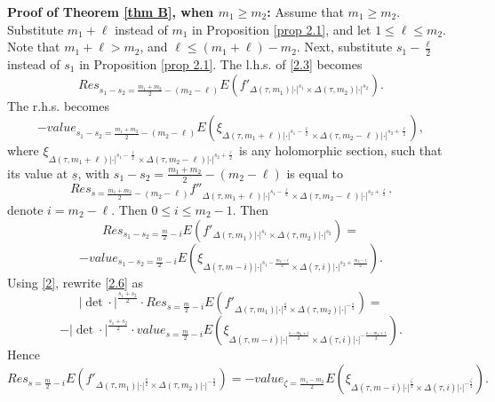 \documentclass[12pts]{amsart}
\begin{document}
 		{\bf Proof of Theorem \ref{thm B}, when $m_1\geq m_2$:} 
 		Assume that $m_1\geq m_2$. Substitute $m_1+\ell$ instead of $m_1$ in Proposition \ref{prop 2.1}, and let $1\leq \ell\leq m_2$. Note that $m_1+\ell>m_2$, and $\ell\leq (m_1+\ell)-m_2$. Next, substitute $s_1-\frac{\ell}{2}$ instead of $s_1$ in Proposition \ref{prop 2.1}. The l.h.s. of \eqref{2.3} becomes
 		\begin{equation}\label{2.4}
 		Res_{s_1-s_2=\frac{m_1+m_2}{2}-(m_2-\ell)}E(f'_{\Delta(\tau,m_1)|\cdot|^{s_1}\times \Delta(\tau,m_2)|\cdot|^{s_2}}).
 		\end{equation}
 		The r.h.s. becomes
 		\begin{equation}\label{2.5}
 		-value_{s_1-s_2=\frac{m_1+m_2}{2}-(m_2-\ell)}E(\xi_{\Delta(\tau,m_1+\ell)|\cdot|^{s_1-\frac{\ell}{2}}\times \Delta(\tau, m_2-\ell)|\cdot|^{s_2+\frac{\ell}{2}}}),
 		\end{equation}
 		where $\xi_{\Delta(\tau,m_1+\ell)|\cdot|^{s_1-\frac{\ell}{2}}\times \Delta(\tau, m_2-\ell)|\cdot|^{s_2+\frac{\ell}{2}}}$ is any holomorphic section, such that its value at $\underline{s}$, with $s_1-s_2=\frac{m_1+m_2}{2}-(m_2-\ell)$ is equal to 
 		$$
 		Res_{s=\frac{m_1+m_2}{2}-(m_2-\ell)}f''_{\Delta(\tau,m_1+\ell)|\cdot|^{s_1-\frac{\ell}{2}}\times \Delta(\tau,m_2-\ell)|\cdot|^{s_2+\frac{\ell}{2}}}.
 		$$
 		denote $i=m_2-\ell$. Then $0\leq i\leq m_2-1$. Then
 		\begin{equation}\label{2.6}
 		Res_{s_1-s_2=\frac{m}{2}-i}E(f'_{\Delta(\tau,m_1)|\cdot|^{s_1}\times \Delta(\tau,m_2)|\cdot|^{s_2}})=
 		\end{equation}
 		$$
 			-value_{s_1-s_2=\frac{m}{2}-i}E(\xi_{\Delta(\tau,m-i)|\cdot|^{s_1-\frac{m_2-i}{2}}\times \Delta(\tau, i)|\cdot|^{s_2+\frac{m_2-i}{2}}}).
 		$$
 		Using \eqref{2}, rewrite \eqref{2.6} as
 		\begin{equation}\label{2.7}
 		|\det\cdot|^{\frac{s_1+s_2}{2}}\cdot Res_{s=\frac{m}{2}-i}E(f'_{\Delta(\tau,m_1)|\cdot|^{\frac{s}{2}}\times \Delta(\tau,m_2)|\cdot|^{-\frac{s}{2}}})=
 		\end{equation}
 		$$
 		-|\det\cdot|^{\frac{s_1+s_2}{2}}\cdot value_{s=\frac{m}{2}-i}E(\xi_{\Delta(\tau,m-i)|\cdot|^{\frac{s-m_2+i}{2}}\times \Delta(\tau, i)|\cdot|^{-\frac{s-m_2+i}{2}}}).
 		$$
 		Hence
 		\begin{equation}\label{2.8}
 		 Res_{s=\frac{m}{2}-i}E(f'_{\Delta(\tau,m_1)|\cdot|^{\frac{s}{2}}\times \Delta(\tau,m_2)|\cdot|^{-\frac{s}{2}}})=
 			-value_{\zeta=\frac{m_1-m_2}{2}}E(\xi_{\Delta(\tau,m-i)|\cdot|^{\frac{\zeta}{2}}\times \Delta(\tau, i)|\cdot|^{-\frac{\zeta}{2}}}).
 		\end{equation}
\end{document}

